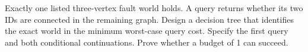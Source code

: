 Exactly one listed three-vertex fault world holds. A query returns whether its two IDs are connected in the remaining graph. Design a decision tree that identifies the exact world in the minimum worst-case query cost. Specify the first query and both conditional continuations. Prove whether a budget of 1 can succeed.
